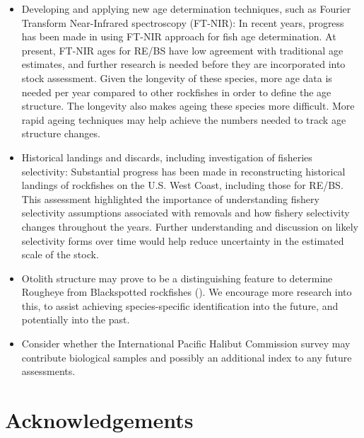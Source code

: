 \documentclass[
]{scrartcl}
\begin{document}
\begin{itemize}
  This will include the consideration of improving the ageing error of
  these species, with a consideration towards decreasing the number of
  ageing error matrices needed, or improving the imprecision of some of
  the current ageing error matrices. This would necessitate the
  re-reading of otoliths (in addition to reading new otoliths).
\item
  Developing and applying new age determination techniques, such as
  Fourier Transform Near-Infrared spectroscopy (FT-NIR): In recent
  years, progress has been made in using FT-NIR approach for fish age
  determination. At present, FT-NIR ages for RE/BS have low agreement
  with traditional age estimates, and further research is needed before
  they are incorporated into stock assessment. Given the longevity of
  these species, more age data is needed per year compared to other
  rockfishes in order to define the age structure. The longevity also
  makes ageing these species more difficult. More rapid ageing
  techniques may help achieve the numbers needed to track age structure
  changes.
\item
  Historical landings and discards, including investigation of fisheries
  selectivity: Substantial progress has been made in reconstructing
  historical landings of rockfishes on the U.S. West Coast, including
  those for RE/BS. This assessment highlighted the importance of
  understanding fishery selectivity assumptions associated with removals
  and how fishery selectivity changes throughout the years. Further
  understanding and discussion on likely selectivity forms over time
  would help reduce uncertainty in the estimated scale of the stock.
\item
  Otolith structure may prove to be a distinguishing feature to
  determine Rougheye from Blackspotted rockfishes
  (). We encourage
  more research into this, to assist achieving species-specific
  identification into the future, and potentially into the past.
\item
  Consider whether the International Pacific Halibut Commission survey
  may contribute biological samples and possibly an additional index to
  any future assessments.
\end{itemize}

\newpage{}

\section{Acknowledgements}\label{sec-acknowledgements}
\end{document}
